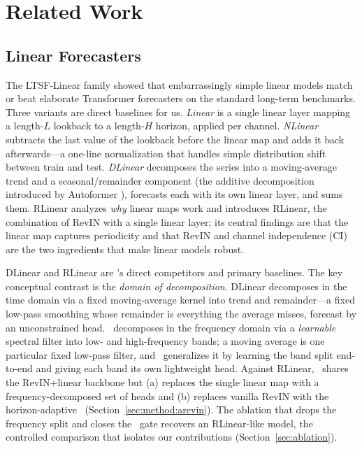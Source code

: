 \section{Related Work}
\label{sec:related}

\subsection{Linear Forecasters}
\label{sec:related:linear}

The LTSF-Linear family \citep{zeng2023dlinear} showed that embarrassingly simple
linear models match or beat elaborate Transformer forecasters on the standard
long-term benchmarks. Three variants are direct baselines for us. \emph{Linear}
is a single linear layer mapping a length-$L$ lookback to a length-$H$ horizon,
applied per channel. \emph{NLinear} subtracts the last value of the lookback
before the linear map and adds it back afterwards---a one-line normalization
that handles simple distribution shift between train and test. \emph{DLinear}
decomposes the series into a moving-average trend and a seasonal/remainder
component (the additive decomposition introduced by Autoformer
\citep{wu2021autoformer}), forecasts each with its own linear layer, and sums
them. RLinear \citep{li2023rlinear} analyzes \emph{why} linear maps work and
introduces RLinear, the combination of RevIN \citep{kim2022revin} with a single
linear layer; its central findings are that the linear map captures periodicity
and that RevIN and channel independence (CI) are the two ingredients that make
linear models robust.

DLinear and RLinear are \method's direct competitors and primary baselines. The
key conceptual contrast is the \emph{domain of decomposition}. DLinear
decomposes in the time domain via a fixed moving-average kernel into trend and
remainder---a fixed low-pass smoothing whose remainder is everything the average
misses, forecast by an unconstrained head. \method\ decomposes in the frequency
domain via a \emph{learnable} spectral filter into low- and high-frequency
bands; a moving average is one particular fixed low-pass filter, and \method\
generalizes it by learning the band split end-to-end and giving each band its
own lightweight head. Against RLinear, \method\ shares the RevIN+linear backbone
but (a) replaces the single linear map with a frequency-decomposed set of heads
and (b) replaces vanilla RevIN with the horizon-adaptive \arevin\
(Section~\ref{sec:method:arevin}). The ablation that drops the frequency split
and closes the \arevin\ gate recovers an RLinear-like model, the controlled
comparison that isolates our contributions
(Section~\ref{sec:ablation}).

